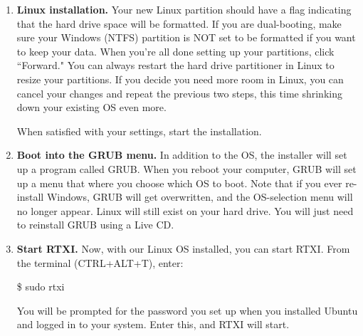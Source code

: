 \begin{enumerate}
\item \textbf{Linux installation.} Your new Linux partition should have a flag indicating that the hard drive space will be formatted. If you are dual-booting, make sure your Windows (NTFS) partition is NOT set to be formatted if you want to keep your data. When you're all done setting up your partitions, click ``Forward." You can always restart the hard drive partitioner in Linux to resize your partitions. If you decide you need more room in Linux, you can cancel your changes and repeat the previous two steps, this time shrinking down your existing OS even more. 

When satisfied with your settings, start the installation. 

\item \textbf{Boot into the GRUB menu.} In addition to the OS, the installer will set up a program called GRUB. When you reboot your computer, GRUB will set up a menu that where you choose which OS to boot. Note that if you ever re-install Windows, GRUB will get overwritten, and the OS-selection menu will no longer appear. Linux will still exist on your hard drive. You will just need to reinstall GRUB using a Live CD.

\item \textbf{Start RTXI.} Now, with our Linux OS installed, you can start RTXI. From the terminal (CTRL+ALT+T), enter:
\begin{example}
\$ sudo rtxi
\end{example}

You will be prompted for the password you set up when you installed Ubuntu and logged in to your system. Enter this, and RTXI will start. 

\end{enumerate}